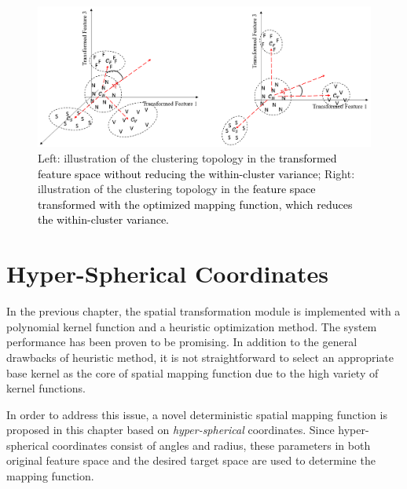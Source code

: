 \begin{figure}[t]
\centering
\includegraphics[scale=.42]{Fig/topo2.png}
\caption{Left: illustration of the clustering topology in the \textcolor{black}{transformed feature space without reducing the within-cluster variance}; %
Right: illustration of the clustering topology in the \textcolor{black}{feature space transformed with the optimized mapping function, which reduces the within-cluster variance.}}%
\label{fig:topo2}
\end{figure}

\section{Hyper-Spherical Coordinates}

In the previous chapter, the spatial transformation module is implemented with a polynomial kernel function and a heuristic optimization method. The system performance has been proven to be promising. In addition to the general drawbacks of heuristic method, it is not straightforward to select an appropriate base kernel as the core of spatial mapping function due to the high variety of kernel functions. %

In order to address this issue, a novel deterministic spatial mapping function is proposed in this chapter based on \textit{hyper-spherical} coordinates\cite{nsphere}. Since hyper-spherical coordinates consist of angles and radius, these parameters in both original feature space and the desired target space are used to determine the mapping function.


